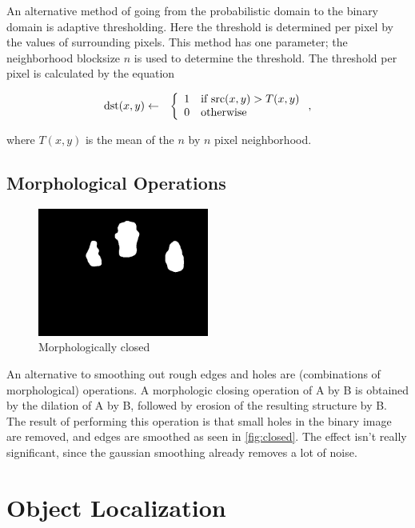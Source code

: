 An alternative method of going from the probabilistic domain to the binary domain is adaptive thresholding. Here the threshold is determined per pixel by the values of surrounding pixels. This method has one parameter; the neighborhood blocksize $n$ is used to determine the threshold. The threshold per pixel is calculated by the equation

\begin{eqnarray}
  \text{dst}(x, y) & \leftarrow & \left\{
  \begin{array}{l l}
	1 & \text{if src}(x,y) > T(x,y) \\
	0 & \text{otherwise} \\
  \end{array} \right.,
\end{eqnarray}

where $T(x,y)$ is the mean of the $n$ by $n$ pixel neighborhood.

\subsection*{Morphological Operations}

\begin{figure}[htbp]
    \center{}
    \includegraphics[width=0.5\textwidth]{figures/pipeline/closed.jpg}
	\caption{Morphologically closed}
	\label{fig:closed}
\end{figure}

An alternative to smoothing out rough edges and holes are (combinations of morphological) operations.  A morphologic closing operation of A by B is obtained by the dilation of A by B, followed by erosion of the resulting structure by B. The result of performing this operation is that small holes in the binary image are removed, and edges are smoothed as seen in \autoref{fig:closed}. The effect isn't really significant, since the gaussian smoothing already removes a lot of noise. 


\section{Object Localization}

